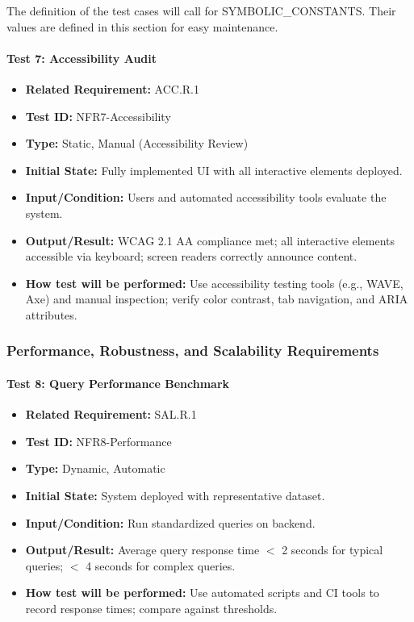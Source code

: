 \documentclass[12pt, titlepage]{article}
\begin{document}
The definition of the test cases will call for SYMBOLIC\_CONSTANTS.
Their values are defined in this section for easy maintenance.

\paragraph{Test 7: Accessibility Audit}
\begin{itemize}
    \item \textbf{Related Requirement:} ACC.R.1
    \item \textbf{Test ID:} NFR7-Accessibility
    \item \textbf{Type:} Static, Manual (Accessibility Review)
    \item \textbf{Initial State:} Fully implemented UI with all interactive elements deployed.
    \item \textbf{Input/Condition:} Users and automated accessibility tools evaluate the system.
    \item \textbf{Output/Result:} WCAG 2.1 AA compliance met; all interactive elements accessible via keyboard; screen readers correctly announce content.
    \item \textbf{How test will be performed:} Use accessibility testing tools (e.g., WAVE, Axe) and manual inspection; verify color contrast, tab navigation, and ARIA attributes.
\end{itemize}

\subsubsection{Performance, Robustness, and Scalability Requirements}

\paragraph{Test 8: Query Performance Benchmark}
\begin{itemize}
    \item \textbf{Related Requirement:} SAL.R.1
    \item \textbf{Test ID:} NFR8-Performance
    \item \textbf{Type:} Dynamic, Automatic
    \item \textbf{Initial State:} System deployed with representative dataset.
    \item \textbf{Input/Condition:} Run standardized queries on backend.
    \item \textbf{Output/Result:} Average query response time $<$ 2 seconds for typical queries; $<$ 4 seconds for complex queries.
    \item \textbf{How test will be performed:} Use automated scripts and CI tools to record response times; compare against thresholds.
\end{itemize}
\end{document}
